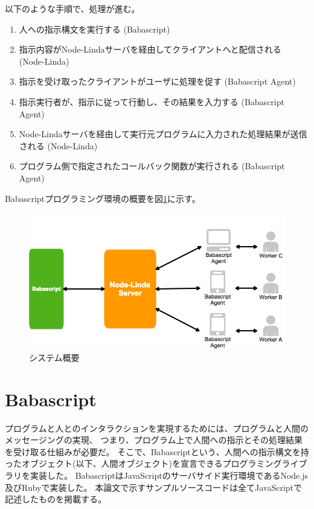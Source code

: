 以下のような手順で、処理が進む。

\begin{enumerate}
\def\labelenumi{\arabic{enumi}.}
\itemsep1pt\parskip0pt
\item
  人への指示構文を実行する (Babascript)
\item
  指示内容がNode-Lindaサーバを経由してクライアントへと配信される
  (Node-Linda)
\item
  指示を受け取ったクライアントがユーザに処理を促す (Babascript Agent)
\item
  指示実行者が、指示に従って行動し、その結果を入力する (Babascript
  Agent)
\item
  Node-Lindaサーバを経由して実行元プログラムに入力された処理結果が送信される
  (Node-Linda)
\item
  プログラム側で指定されたコールバック関数が実行される (Babascript
  Agent)
\end{enumerate}

Babascriptプログラミング環境の概要を図\ref{fig:system_image}に示す。

\begin{figure}[htbp]
  \begin{center}
  \includegraphics[width=.7\linewidth,bb=0 0 834 443]{images/overview.png}
  \end{center}
  \caption{システム概要}
  \label{fig:system_image}
\end{figure}

\section{Babascript}\label{babascript}

プログラムと人とのインタラクションを実現するためには、プログラムと人間のメッセージングの実現、
つまり、プログラム上で人間への指示とその処理結果を受け取る仕組みが必要だ。
そこで、Babascriptという、人間への指示構文を持ったオブジェクト(以下、人間オブジェクト)を宣言できるプログラミングライブラリを実装した。
BabascriptはJavaScriptのサーバサイド実行環境であるNode.js及びRubyで実装した。
本論文で示すサンプルソースコードは全てJavaScriptで記述したものを掲載する。

